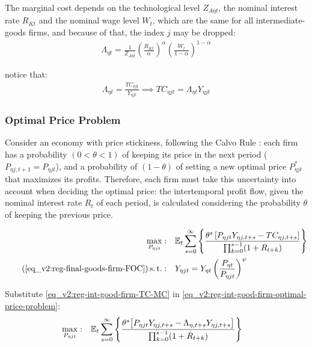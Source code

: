 \documentclass[../thesis.tex]{subfiles}
\begin{document}
The marginal cost depends on the technological level $Z_{A\eta t}$, the nominal interest rate $R_{Kt}$ and the nominal wage level $W_t$, which are the same for all intermediate-goods firms, and because of that, the index $j$ may be dropped:
\begin{align}
	\label{eq_v2:reg-int-good-firm-MC-2}
	\Lambda_{\eta t} = \frac{1}{Z_{A\eta t}} \left( \frac{R_{Kt}}{{\alpha_{}}} \right)^{{\alpha_{}}} \left( \frac{W_t}{1-{\alpha_{}}} \right)^{1-{\alpha_{}}}
\end{align}

notice that:
\begin{align}
	\label{eq_v2:reg-int-good-firm-TC-MC}
	\Lambda_{\eta t} = \frac{TC_{\eta jt}}{Y_{\eta jt}} \implies 
	TC_{\eta jt} = \Lambda_{\eta t} Y_{\eta jt}
\end{align}


\subsubsection*{Optimal Price Problem}

Consider an economy with price stickiness, following the Calvo Rule \cite{calvo_staggered_1983}: each firm has a probability $(0 < \theta < 1)$ of keeping its price in the next period ($P_{\eta j,t+1} = P_{\eta jt}$), and a probability of $(1 - \theta)$ of setting a new optimal price $P_{\eta jt}^{\ast}$ that maximizes its profits. Therefore, each firm must take this uncertainty into account when deciding the optimal price: the intertemporal profit flow, given the nominal interest rate $R_{t}$ of each period, is calculated considering the probability $\theta$ of keeping the previous price.

\begin{align}
	\label{eq_v2:reg-int-good-firm-optimal-price-problem}
	\max_{P_{\eta jt}}: & \quad \E \sum_{s=0}^{\infty} \left\{ \frac{ \theta^s \left[ P_{\eta jt} Y_{\eta j,t+s} - TC_{\eta j,t+s} \right]}{\prod_{k=0}^{s-1}(1+R_{t+k})} \right\} \\
	\tag{\ref{eq_v2:reg-final-goods-firm-FOC}}
	\st: & \quad Y_{\eta jt} = Y_{\eta t} \left( \frac{P_{\eta t}}{P_{\eta jt}} \right)^{\psi}
\end{align}


Substitute \ref{eq_v2:reg-int-good-firm-TC-MC} in \ref{eq_v2:reg-int-good-firm-optimal-price-problem}:
\begin{align}
	\label{eq_v2:reg-int-good-firm-optimal-price-problem-2}
	\max_{P_{\eta jt}}: & \quad {\mathbb{E}_{t}} \sum_{s=0}^{\infty} \left\{ \frac{\theta^s \big[ P_{\eta jt} Y_{\eta j,t+s} - \Lambda_{\eta, t+s} Y_{\eta j,t+s} \big]}{\prod_{k=0}^{s-1}(1+R_{t+k})} \right\}
\end{align}
\end{document}
